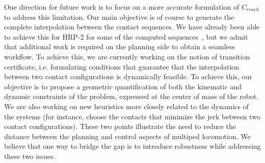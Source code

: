 One direction for future work is to focus on a more accurate formulation of $C_{reach}$ to address 
this limitation.
Our main objective is of course to generate the complete interpolation between the contact sequences.
We have already been able to achieve this for HRP-2 for some of the computed sequences~\citep{Carpentier2016}, but we admit that additional
work is required on the planning side to obtain a seamless workflow. To achieve this, we are currently working on the notion of transition certificate, i.e. formulating
conditions that guarantee that the interpolation between two contact configurations is dynamically feasible.
To achieve this, our objective is to propose a geometric quantification of both the kinematic and dynamic constraints of the problem, expressed
at the center of mass of the robot.
 We are also
working on new heuristics more closely related to the dynamics of the systems (for instance, choose the contacts that minimize the jerk between two contact configurations).
These two points illustrate the need to reduce the distance between the planning and control aspects of multiped locomotion. We believe that one way 
to bridge the gap is to introduce robustness while addressing these two issues.
